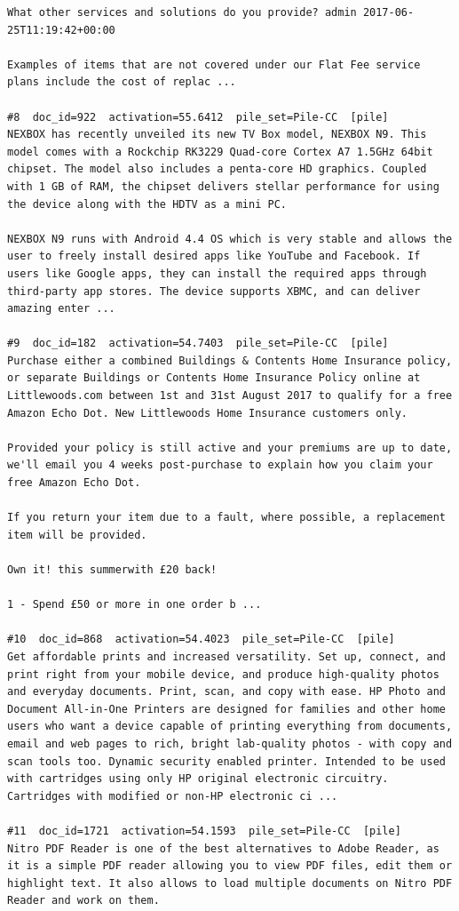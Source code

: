\begin{verbatim}
What other services and solutions do you provide? admin 2017-06-25T11:19:42+00:00

Examples of items that are not covered under our Flat Fee service plans include the cost of replac ...

#8  doc_id=922  activation=55.6412  pile_set=Pile-CC  [pile]
NEXBOX has recently unveiled its new TV Box model, NEXBOX N9. This model comes with a Rockchip RK3229 Quad-core Cortex A7 1.5GHz 64bit chipset. The model also includes a penta-core HD graphics. Coupled with 1 GB of RAM, the chipset delivers stellar performance for using the device along with the HDTV as a mini PC.

NEXBOX N9 runs with Android 4.4 OS which is very stable and allows the user to freely install desired apps like YouTube and Facebook. If users like Google apps, they can install the required apps through third-party app stores. The device supports XBMC, and can deliver amazing enter ...

#9  doc_id=182  activation=54.7403  pile_set=Pile-CC  [pile]
Purchase either a combined Buildings & Contents Home Insurance policy, or separate Buildings or Contents Home Insurance Policy online at Littlewoods.com between 1st and 31st August 2017 to qualify for a free Amazon Echo Dot. New Littlewoods Home Insurance customers only.

Provided your policy is still active and your premiums are up to date, we'll email you 4 weeks post-purchase to explain how you claim your free Amazon Echo Dot.

If you return your item due to a fault, where possible, a replacement item will be provided.

Own it! this summerwith £20 back!

1 - Spend £50 or more in one order b ...

#10  doc_id=868  activation=54.4023  pile_set=Pile-CC  [pile]
Get affordable prints and increased versatility. Set up, connect, and print right from your mobile device, and produce high-quality photos and everyday documents. Print, scan, and copy with ease. HP Photo and Document All-in-One Printers are designed for families and other home users who want a device capable of printing everything from documents, email and web pages to rich, bright lab-quality photos - with copy and scan tools too. Dynamic security enabled printer. Intended to be used with cartridges using only HP original electronic circuitry. Cartridges with modified or non-HP electronic ci ...

#11  doc_id=1721  activation=54.1593  pile_set=Pile-CC  [pile]
Nitro PDF Reader is one of the best alternatives to Adobe Reader, as it is a simple PDF reader allowing you to view PDF files, edit them or highlight text. It also allows to load multiple documents on Nitro PDF Reader and work on them.


\end{verbatim}
